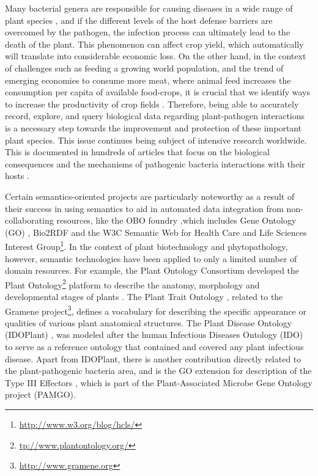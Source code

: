 \documentclass[sw]{iosart2c}
\newcommand{\myurl}[1]{\footnote{\url{#1}}}
\begin{document}
Many bacterial genera are responsible for causing diseases in a wide range of plant species \cite{Mansfield}, and if the different levels of the host defense barriers are overcomed by the pathogen, the infection process can ultimately lead to the death of the plant. This phenomenon can affect crop yield, which automatically will translate into considerable economic loss. On the other hand, in the context of challenges such as feeding a growing world population, and the trend of emerging economies to consume more meat, where animal feed increases the consumption per capita of available food-crops, it is crucial that we identify ways to increase the productivity of crop fields \cite{Montesinos}. Therefore, being able to accurately record, explore, and query biological data regarding plant-pathogen interactions is a necessary step towards the improvement and protection of these important plant species. This issue continues being subject of intensive research worldwide. This is documented in hundreds of articles that focus on the biological consequences and the mechanisms of pathogenic bacteria interactions with their hosts \cite{DeWit} \cite {Dodds}. 


Certain semantics-oriented projects are particularly noteworthy as a result of their success in using semantics to aid in automated data  integration from non-collaborating resources, like the OBO foundry \cite{Smith},which includes Gene Ontology (GO) \cite{Gene}, Bio2RDF \cite{RDF} and the W3C Semantic  Web  for Health  Care  and  Life Sciences Interest Group\myurl{http://www.w3.org/blog/hcls/}. In the context of plant biotechnology and phytopathology, however, semantic technologies have been applied to only a limited number of domain resources. For example, the Plant Ontology Consortium developed the Plant Ontology\myurl{tp://www.plantontology.org/} platform to describe the anatomy, morphology and developmental stages of plants \cite{PO}. The Plant Trait Ontology \cite{PTO}, related to the Gramene project\myurl{http://www.gramene.org}, defines a vocabulary for describing the specific appearance or qualities of various plant anatomical structures. The Plant Disease Ontology (IDOPlant) \cite{Walls}, was modeled after the human Infectious Diseases Ontology (IDO) \cite{IDO} to serve as a reference ontology that contained and covered any plant infectious disease. Apart from IDOPlant, there is another contribution directly related to the plant-pathogenic bacteria area, and is the GO extension for description of the Type III Effectors \cite{Lindeberg}, which is part of the Plant-Associated Microbe Gene Ontology project (PAMGO). 
\end{document}
